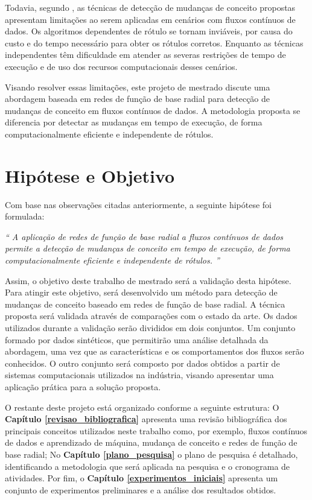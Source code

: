 \documentclass[qual, classic, a4paper]{ufbathesis}
\begin{document}
Todavia, segundo ,
as técnicas de detecção de mudanças de conceito propostas apresentam limitações ao serem aplicadas em cenários com fluxos contínuos de dados.
% 
Os algoritmos dependentes de rótulo se tornam inviáveis, por causa do custo e do tempo necessário para obter os rótulos corretos.
%
Enquanto as técnicas independentes têm dificuldade em atender as severas restrições de tempo de execução e de uso dos recursos computacionais desses cenários.

Visando resolver essas limitações, 
este projeto de mestrado discute uma abordagem baseada em redes de função de base radial 
para detecção de mudanças de conceito em fluxos contínuos de dados.
A metodologia proposta se diferencia por detectar as mudanças em tempo de execução, de forma computacionalmente eficiente e independente de rótulos.

\section{Hipótese e Objetivo}

Com base nas observações citadas anteriormente, a seguinte hipótese foi formulada:

\begin{center}
\textit{``
A aplicação de redes de função de base radial a fluxos contínuos de dados permite a detecção de mudanças de conceito em tempo de execução, de forma computacionalmente eficiente e independente de rótulos.
''}
\end{center}

Assim, o objetivo deste trabalho de mestrado será a validação desta hipótese.
%
Para atingir este objetivo, será desenvolvido um método para detecção de mudanças de conceito baseado em redes de função de base radial.
%
A técnica proposta será validada através de comparações com o estado da arte.
%
Os dados utilizados durante a validação serão divididos em dois conjuntos.
%
Um conjunto formado por dados sintéticos, que permitirão uma análise detalhada da abordagem, uma vez que as características e os comportamentos dos fluxos serão conhecidos.
%
O outro conjunto será composto por dados obtidos a partir de sistemas computacionais utilizados na indústria, visando apresentar uma aplicação prática para a solução proposta. 

O restante deste projeto está organizado conforme a seguinte estrutura: 
%
O \textbf{Capítulo \ref{revisao_bibliografica}} apresenta uma revisão bibliográfica dos principais conceitos utilizados neste trabalho como, por exemplo, fluxos contínuos de dados e aprendizado de máquina, mudança de conceito e redes de função de base radial; 
%
No \textbf{Capítulo \ref{plano_pesquisa}} o plano de pesquisa é detalhado, identificando a metodologia que será aplicada na pesquisa e o cronograma de atividades. 
%
Por fim, o \textbf{Capítulo \ref{experimentos_iniciais}} apresenta um conjunto de experimentos preliminares e a análise dos resultados obtidos.
\end{document}
